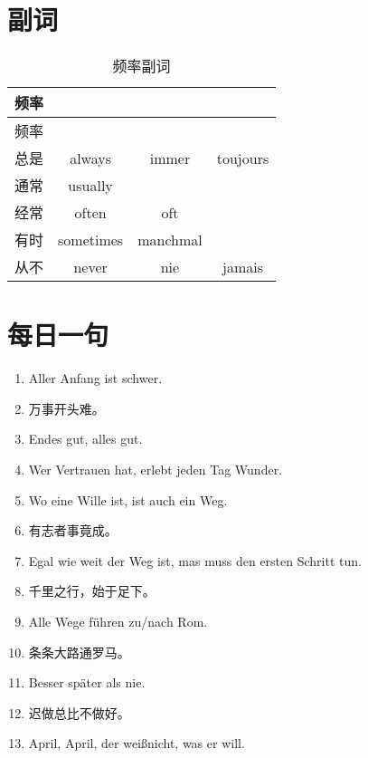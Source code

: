 \documentclass[12pt,A4paper,oneside,reqno]{amsart}
\numberwithin{equation}{section}
\theoremstyle{plain}
\theoremstyle{plain}
\theoremstyle{plain}
\numberwithin{equation}{section}
\theoremstyle{remark}
\begin{document}
\section{副词}
\begin{longtable}{c|c|c|c}
	\hline
	频率	&		&		&		\\
	
	\hline
	\endhead
	\hline
	频率	&		&		&		\\
	
	\hline
	\endfirsthead	
	\hline
	\endfoot
	\hline		
	\caption{频率副词}
	\endlastfoot				
总是	&	always	&	immer	&	toujours	\\
通常	&	usually	&		&		\\
经常	&	often	&	oft	&		\\
有时	&	sometimes	&	manchmal	&		\\
从不	&	never	&	nie	&	jamais	\\



	
\end{longtable}
\section{每日一句}
\begin{enumerate}[1.]
	\item Aller Anfang ist schwer.
	\item []万事开头难。
	\item []Endes gut, alles gut.
	\item Wer Vertrauen hat, erlebt jeden Tag Wunder.
	\item[] Wo eine Wille ist, ist auch ein Weg.
	\item[]有志者事竟成。
	\item Egal wie weit der Weg ist, mas muss den ersten Schritt tun.
	\item[] 千里之行，始于足下。
	\item Alle Wege f\"{u}hren zu/nach Rom.
	\item []条条大路通罗马。
	\item Besser sp\"{a}ter als nie.
	\item []迟做总比不做好。
	\item April, April, der wei\ss nicht, was er will.
\end{enumerate}









\end{document}
